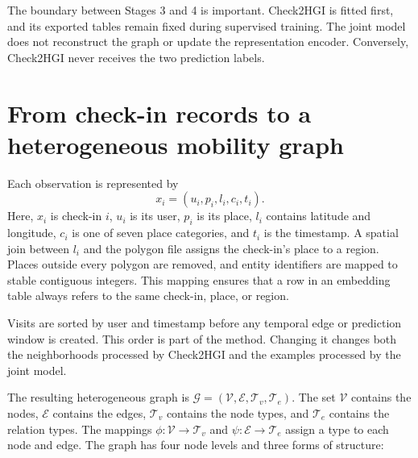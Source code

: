 The boundary between Stages 3 and 4 is important. Check2HGI is fitted first, and
its exported tables remain fixed during supervised training. The joint model does
not reconstruct the graph or update the representation encoder. Conversely,
Check2HGI never receives the two prediction labels.

\section{From check-in records to a heterogeneous mobility graph}
\label{sec:apx-check2hgi-input}

Each observation is represented by
\begin{equation}
    x_i=(u_i,p_i,l_i,c_i,t_i).
    \label{eq:apx-checkin-tuple}
\end{equation}
Here, $x_i$ is check-in $i$, $u_i$ is its user, $p_i$ is its place, $l_i$
contains latitude and longitude, $c_i$ is one of seven place categories, and $t_i$
is the timestamp. A spatial join between $l_i$ and the polygon file assigns the
check-in's place to a region. Places outside every polygon are removed, and entity
identifiers are mapped to stable contiguous integers. This mapping ensures that a
row in an embedding table always refers to the same check-in, place, or region.

Visits are sorted by user and timestamp before any temporal edge or prediction window
is created. This order is part of the method. Changing it changes both the
neighborhoods processed by Check2HGI and the examples processed by the joint model.

The resulting heterogeneous graph is
$\mathcal{G}=(\mathcal{V},\mathcal{E},\mathcal{T}_v,\mathcal{T}_e)$. The set
$\mathcal{V}$ contains the nodes, $\mathcal{E}$ contains the edges,
$\mathcal{T}_v$ contains the node types, and $\mathcal{T}_e$ contains the relation
types. The mappings $\phi:\mathcal{V}\rightarrow\mathcal{T}_v$ and
$\psi:\mathcal{E}\rightarrow\mathcal{T}_e$ assign a type to each node and edge.
The graph has four node levels and three forms of structure:

